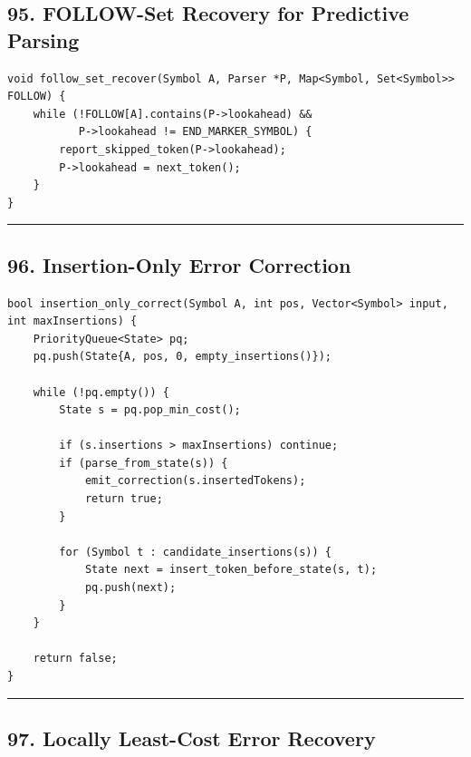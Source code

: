 \documentclass[10pt,letterpaper]{article}
\begin{document}
\subsection*{95. FOLLOW-Set Recovery for Predictive Parsing}

\begin{verbatim}
void follow_set_recover(Symbol A, Parser *P, Map<Symbol, Set<Symbol>> FOLLOW) {
    while (!FOLLOW[A].contains(P->lookahead) &&
           P->lookahead != END_MARKER_SYMBOL) {
        report_skipped_token(P->lookahead);
        P->lookahead = next_token();
    }
}
\end{verbatim}

\medskip\hrule\medskip

\subsection*{96. Insertion-Only Error Correction}

\begin{verbatim}
bool insertion_only_correct(Symbol A, int pos, Vector<Symbol> input, int maxInsertions) {
    PriorityQueue<State> pq;
    pq.push(State{A, pos, 0, empty_insertions()});

    while (!pq.empty()) {
        State s = pq.pop_min_cost();

        if (s.insertions > maxInsertions) continue;
        if (parse_from_state(s)) {
            emit_correction(s.insertedTokens);
            return true;
        }

        for (Symbol t : candidate_insertions(s)) {
            State next = insert_token_before_state(s, t);
            pq.push(next);
        }
    }

    return false;
}
\end{verbatim}

\medskip\hrule\medskip

\subsection*{97. Locally Least-Cost Error Recovery}
\end{document}
